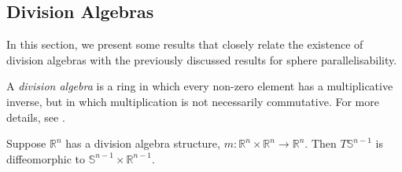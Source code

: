 \documentclass[12pt,a4paper]{article}
\begin{document}
\subsection{Division Algebras}
In this section, we present some results that closely relate the existence of division algebras with the previously discussed results for sphere parallelisability.
\begin{definition}
A \textit{division algebra} is a ring in which every non-zero element has a multiplicative inverse, but in which multiplication is not necessarily commutative. For more details, see \cite{MR1415833}.
\end{definition}
\begin{theorem}
Suppose $\mathbb{R}^n$ has a division algebra structure, $m:\mathbb{R}^n\times\mathbb{R}^n\to\mathbb{R}^n$. Then $T\mathbb{S}^{n-1}$ is diffeomorphic to $\mathbb{S}^{n-1}\times\mathbb{R}^{n-1}$.
\end{theorem}
\end{document}
